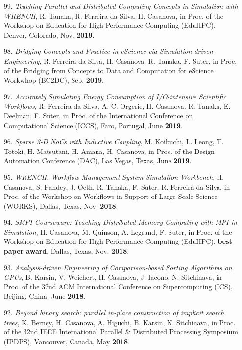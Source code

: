 \begin{enumerate}
\item [99.] {\it Teaching Parallel and Distributed Computing Concepts in
Simulation with WRENCH}, R. Tanaka, R. Ferreira da Silva, H. Casanova, in
Proc. of the Workshop on Education for High-Performance Computing (EduHPC),
Denver, Colorado, Nov. {\bf 2019}.



\item [98.] {\it Bridging Concepts and Practice in eScience via
      Simulation-driven Engineering},
    R. Ferreira da Silva, H. Casanova, R. Tanaka, F. Suter,
	in Proc. of the Bridging from Concepts to Data and Computation for
	eScience Workwhop (BC2DC), Sep. {\bf 2019}.

\item [97.] {\it Accurately Simulating Energy Consumption of I/O-intensive Scientific Workflows}, R. Ferreira da Silva, A.-C. Orgerie, H. Casanova, R. Tanaka, E. Deelman, F. Suter, in Proc. of the International Conference on Computational Science (ICCS), Faro, Portugal, June {\bf 2019}.

\item [96.] {\it Sparse 3-D NoCs with Inductive Coupling}, M. Koibuchi, L. Leong, T. Totoki, H. Matsutani, H. Amana, H. Casanova, in Proc. of the Design Automation Conference (DAC), Las Vegas, Texas, June {\bf 2019}.

\item [95.] {\it WRENCH: Workflow Management System Simulation Workbench}, H. Casanova, S. Pandey, J. Oeth, R. Tanaka, F. Suter, R. Ferreira da Silva, in Proc. of the Workshop on Workflows in Support of Large-Scale Science (WORKS), Dallas, Texas, Nov. {\bf 2018}.

\item [94.] {\it SMPI Courseware: Teaching Distributed-Memory Computing with MPI in Simulation}, H. Casanova, M. Quinson, A. Legrand, F. Suter, in Proc. of the Workshop on Education for High-Performance Computing (EduHPC), {\bf best paper award}, Dallas, Texas, Nov. {\bf 2018}.

\item [93.] {\it Analysis-driven Engineering of Comparison-based Sorting
    Algorithms on GPUs},
    B. Karsin, V. Weichert, H. Casanova, J. Iacono, N. Sitchinava, 
in Proc. of the 32nd ACM International Conference on Supercomputing
(ICS), Beijing, China, June {\bf 2018}.

\item [92.] {\it Beyond binary search: parallel in-place construction of implicit search trees},
K. Berney, H. Casanova, A. Higuchi, B. Karsin, N. Sitchinava,
in Proc. of the 32nd IEEE International Parallel \& Distributed Processing Symposium (IPDPS), Vancouver, Canada, May {\bf 2018}.



\end{enumerate}
